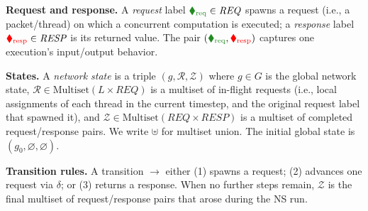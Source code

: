 
\noindent
\textbf{Request and response.}
A \emph{request} label ${\color{ForestGreen}\blacklozenge_\text{req}}\in\mathit{REQ}$ spawns a request (i.e., a packet/thread) on which a concurrent computation is executed; a \emph{response} label ${\color{red}\blacklozenge_\text{resp}}\in\mathit{RESP}$ is its returned value. The pair $({\color{ForestGreen}\blacklozenge_\text{req}},{\color{red}\blacklozenge_\text{resp}})$ captures one execution’s input/output behavior.



\smallskip
\noindent
\textbf{States.}
A \emph{network state} is a triple $(g,\mathcal{R},\mathcal{Z})$ where
$g \in G$ is the global network state,
$\mathcal{R} \in \mathrm{Multiset}(L \times \mathit{REQ})$ is a multiset of in-flight requests (i.e., local assignments of each thread in the current timestep, and the original request label that spawned it),
and $\mathcal{Z} \in \mathrm{Multiset}(\mathit{REQ} \times \mathit{RESP})$ is a multiset of completed request/response pairs.
%
We write $\uplus$ for multiset union.
%
The initial global state is $(g_0, \varnothing, \varnothing)$.




\smallskip
\noindent
\textbf{Transition rules.}
A transition $\longrightarrow$ either (1) spawns a request; (2) advances one request via $\delta$; or (3) returns a response. When no further steps remain, $\mathcal{Z}$ is the final multiset of request/response pairs that arose during the NS run.







